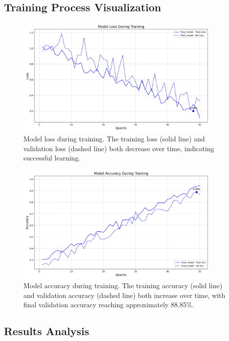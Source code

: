 \documentclass[10pt]{article}
\begin{document}
\subsection{Training Process Visualization}

\begin{figure}[h!]
    \centering
    \includegraphics[width=0.9\textwidth]{figures/loss_curves.png}
    \caption{Model loss during training. The training loss (solid line) and validation loss (dashed line) both decrease over time, indicating successful learning.}
    \label{fig:model_loss}
\end{figure}

\begin{figure}[h!]
    \centering
    \includegraphics[width=0.9\textwidth]{figures/accuracy_curves.png}
    \caption{Model accuracy during training. The training accuracy (solid line) and validation accuracy (dashed line) both increase over time, with final validation accuracy reaching approximately 88.85\%.}
    \label{fig:model_accuracy}
\end{figure}

\subsection{Results Analysis}
\end{document}
